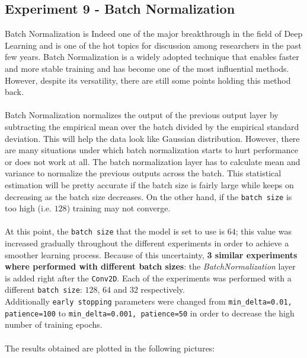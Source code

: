 \documentclass[11pt,a4paper]{article}
\begin{document}
\subsection{Experiment 9 - Batch Normalization}
Batch Normalization is Indeed one of the major breakthrough in the field of Deep Learning and is one of the hot topics for discussion among researchers in the past few years. Batch Normalization is a widely adopted technique that enables faster and more stable training and has become one of the most influential methods. However, despite its versatility, there are still some points holding this method back.\\
\\
Batch Normalization normalizes the output of the previous output layer by subtracting the empirical mean over the batch divided by the empirical standard deviation. This will help the data look like Gaussian distribution. However, there are many situations under which batch normalization starts to hurt performance or does not work at all. The batch normalization layer has to calculate mean and variance to normalize the previous outputs across the batch. This statistical estimation will be pretty accurate if the batch size is fairly large while keeps on decreasing as the batch size decreases. On the other hand, if the \texttt{batch size} is too high (i.e. $128$) training may not converge. \cite{10.1007/978-3-030-58610-2_14}\\
\\
At this point, the \texttt{batch size} that the model is set to use is $64$; this value was increased gradually throughout the different experiments in order to achieve a smoother learning process. Because of this uncertainty, \textbf{3 similar experiments where performed with different batch sizes}: the \textit{BatchNormalization} layer is added right after the \texttt{Conv2D}. Each of the experiments was performed with a different \texttt{batch size}: $128$, $64$ and $32$ respectively.\\
Additionally \texttt{early stopping} parameters were changed from \texttt{min\_delta=0.01, patience=100} to \texttt{min\_delta=0.001, patience=50} in order to decrease the high number of training epochs.\\
\\
The results obtained are plotted in the following pictures:
\end{document}

